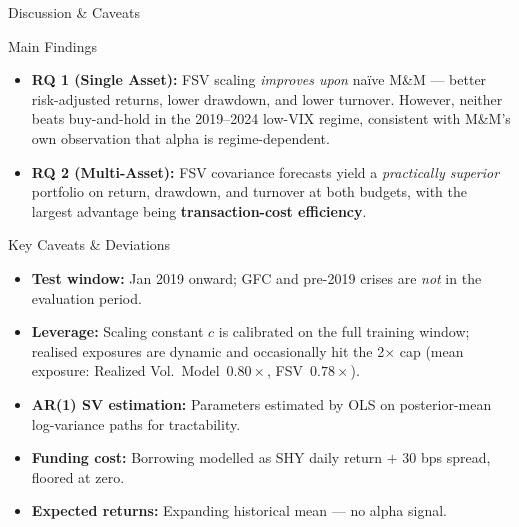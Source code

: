 \documentclass[10pt]{beamer}\usepackage[]{graphicx}\usepackage[table]{xcolor}
\begin{document}
\begin{frame}{Discussion \& Caveats}

  \begin{block}{Main Findings}
    \begin{itemize}
      \setlength\itemsep{0.4em}
      \item \textbf{RQ 1 (Single Asset):} FSV scaling \textit{improves upon} na\"{i}ve M\&M ---
            better risk-adjusted returns, lower drawdown, and lower turnover. However,
            neither beats buy-and-hold in the 2019--2024 low-VIX regime, consistent
            with M\&M's own observation that alpha is regime-dependent.
      \item \textbf{RQ 2 (Multi-Asset):} FSV covariance forecasts yield a
            \textit{practically superior} portfolio on return, drawdown, and turnover
            at both budgets, with the largest advantage being \textbf{transaction-cost efficiency}.
    \end{itemize}
  \end{block}

  \begin{alertblock}{Key Caveats \& Deviations}
    \begin{itemize}
      \setlength\itemsep{0.3em}
      \item \textbf{Test window:} Jan 2019 onward; GFC and pre-2019 crises are
            \textit{not} in the evaluation period.
      \item \textbf{Leverage:} Scaling constant $c$ is calibrated on the full
            training window; realised exposures are dynamic and occasionally hit the 2$\times$ cap
            (mean exposure: Realized Vol.\ Model~$0.80\times$, FSV~$0.78\times$).
      \item \textbf{AR(1) SV estimation:} Parameters estimated by OLS on
            posterior-mean log-variance paths for tractability.
      \item \textbf{Funding cost:} Borrowing modelled as SHY daily return
            $+$ 30 bps spread, floored at zero.
      \item \textbf{Expected returns:} Expanding historical mean --- no alpha signal.
    \end{itemize}
  \end{alertblock}

\end{frame}

\end{document}
